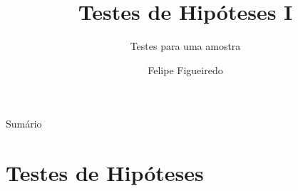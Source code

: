\documentclass{beamer}
\title%
{Testes de Hipóteses I}
\subtitle
{Testes para uma amostra} %
\author%
{Felipe Figueiredo}%
\institute[INTO] %
{Instituto Nacional de Traumatologia e Ortopedia
}
\date%
{}
\begin{document}
\begin{frame}
  \titlepage
\end{frame}

\begin{frame}{Sumário}
  \tableofcontents
\end{frame}








\section{Testes de Hipóteses}
\end{document}
